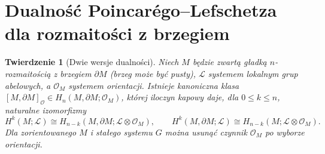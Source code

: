 \documentclass[11pt,a4paper,oneside]{report}
\theoremstyle{plain}
\newtheorem{twierdzenie}{Twierdzenie}[section]
\theoremstyle{definition}
\theoremstyle{remark}
\begin{document}
\section{Dualność Poincarégo--Lefschetza dla rozmaitości z brzegiem}
\label{sec:pl-v4}
\begin{twierdzenie}[Dwie wersje dualności]
\label{thm:pl-v4}
Niech $M$ będzie zwartą gładką $n$-rozmaitością z brzegiem
$\partial M$ (brzeg może być pusty),
$\mathcal L$ systemem lokalnym grup abelowych, a
$\mathcal O_M$ systemem orientacji. Istnieje kanoniczna
klasa $[M,\partial M]_{\mathcal O}\in
H_n(M,\partial M;\mathcal O_M)$, której iloczyn kapowy
daje, dla $0\le k\le n$, naturalne izomorfizmy
\[
H^k(M;\mathcal L)\cong
H_{n-k}(M,\partial M;\mathcal L\otimes\mathcal O_M),\qquad
H^k(M,\partial M;\mathcal L)\cong
H_{n-k}(M;\mathcal L\otimes\mathcal O_M).
\]
Dla zorientowanego $M$ i stałego systemu $G$
można usunąć czynnik $\mathcal O_M$ po wyborze orientacji.
\end{twierdzenie}
\end{document}
